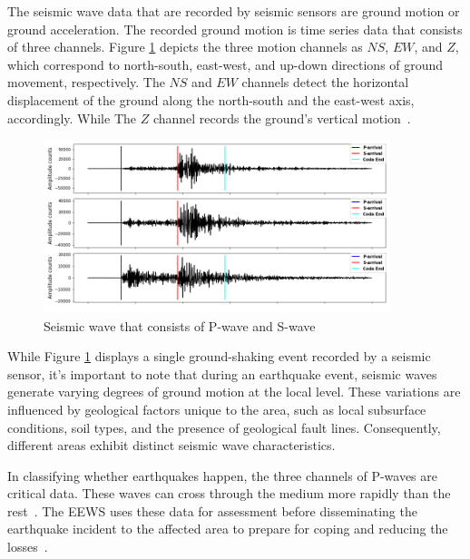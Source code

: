 The seismic wave data that are recorded by seismic sensors are ground motion or ground acceleration. The recorded ground motion is time series data that consists of three channels. Figure \ref{fig:seismic-wave} depicts the three motion channels as $NS$, $EW$, and $Z$, which correspond to north-south, east-west, and up-down directions of ground movement, respectively. The $NS$ and $EW$ channels detect the horizontal displacement of the ground along the north-south and the east-west axis, accordingly. While The $Z$ channel records the ground's vertical motion~\cite{chiang2022neural}. 
\begin{figure}[ht]
    \centering
    \includegraphics[width=0.9\textwidth]{img/3ch.png}
    \caption{Seismic wave that consists of P-wave and S-wave}
    \label{fig:seismic-wave}
\end{figure}

While Figure \ref{fig:seismic-wave} displays a single ground-shaking event recorded by a seismic sensor, it's important to note that during an earthquake event, seismic waves generate varying degrees of ground motion at the local level. These variations are influenced by geological factors unique to the area, such as local subsurface conditions, soil types, and the presence of geological fault lines. Consequently, different areas exhibit distinct seismic wave characteristics.
 

In classifying whether earthquakes happen, the three channels of P-waves are critical data. These waves can cross through the medium more rapidly than the rest~\cite{chiang2022neural, allen2019earthquake}. The EEWS uses these data for assessment before disseminating the earthquake incident to the affected area to prepare for coping and reducing the losses~\cite{chiang2022neural}. 

